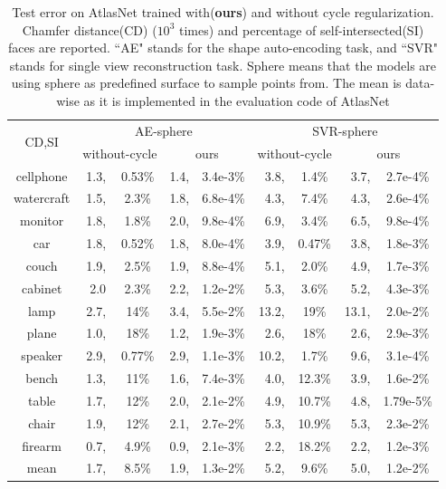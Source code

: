 \begin{table}
	\caption{Test error on AtlasNet trained with(\textbf{ours}) and without cycle regularization. Chamfer distance(CD) ($10^3$ times) and percentage of self-intersected(SI) faces are reported. ``AE" stands for the shape auto-encoding task, and ``SVR" stands for single view reconstruction task. Sphere means that the models are using sphere as predefined surface to sample points from. The mean is data-wise as it is implemented in the evaluation code of AtlasNet}
	\label{tab:atlas}
	\centering
	\begin{tabular}{c|rc|rc|rc|rc|}
		\multirow{2}{*}{CD,SI} &\multicolumn{4}{c|}{AE-sphere}&\multicolumn{4}{c|}{SVR-sphere}\\
		\cline{2-9}
		~& \multicolumn{2}{c|}{without-cycle} & \multicolumn{2}{c|}{ours} & \multicolumn{2}{c|}{without-cycle} & \multicolumn{2}{c|}{ours} \\
		\hline
		cellphone&1.3,&0.53\%&1.4,&3.4e-3\%&3.8,&1.4\%&3.7,&2.7e-4\%\\
		watercraft&1.5,&2.3\%&1.8,&6.8e-4\%&4.3,&7.4\%&4.3,&2.6e-4\%\\
		monitor&1.8,&1.8\%&2.0,&9.8e-4\%&6.9,&3.4\%&6.5,&9.8e-4\%\\
		car&1.8,&0.52\%&1.8,&8.0e-4\%&3.9,&0.47\%&3.8,&1.8e-3\%\\
		couch&1.9,&2.5\%&1.9,&8.8e-4\%&5.1,&2.0\%&4.9,&1.7e-3\%\\
		cabinet&2.0&2.3\%&2.2,&1.2e-2\%&5.3,&3.6\%&5.2,&4.3e-3\%\\
		lamp&2.7,&14\%&3.4,&5.5e-2\%&13.2,&19\%&13.1,&2.0e-2\%\\
		plane&1.0,&18\%&1.2,&1.9e-3\%&2.6,&18\%&2.6,&2.9e-3\%\\
		speaker&2.9,&0.77\%&2.9,&1.1e-3\%&10.2,&1.7\%&9.6,&3.1e-4\%\\
		bench&1.3,&11\%&1.6,&7.4e-3\%&4.0,&12.3\%&3.9,&1.6e-2\%\\
		table&1.7,&12\%&2.0,&2.1e-2\%&4.9,&10.7\%&4.8,&1.79e-5\%\\
		chair&1.9,&12\%&2.1,&2.7e-2\%&5.3,&10.9\%&5.3,&2.3e-2\%\\
		firearm&0.7,&4.9\%&0.9,&2.1e-3\%&2.2,&18.2\%&2.2,&1.2e-3\%\\
		\hline
		mean &1.7,&8.5\%&1.9,& 1.3e-2\% &5.2,&9.6\%&5.0,&1.2e-2\%\\
		
	\end{tabular}
\end{table}

